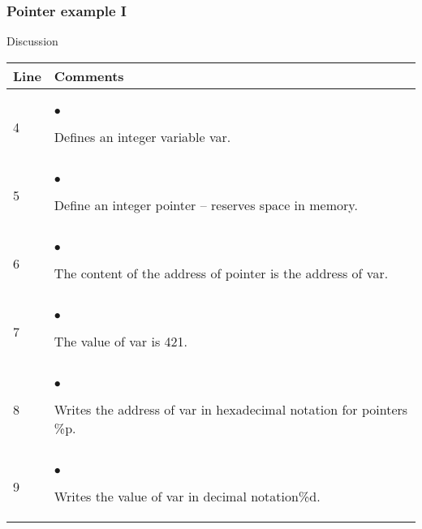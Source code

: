 \documentclass[compress]{beamer}
\begin{document}
\frame
{
  \frametitle{Pointer example I}
  \begin{block}{Discussion}
{\small
\begin{center}
%
\begin{tabular}{|ll|}\hline
\hfill Line \hfill
&\hspace*{\fill} Comments \hspace*{\fill}\\ \hline
&  \\[-2mm]
4 &$\bullet$
\begin{minipage}[t]{0.65\textwidth}
Defines an integer variable var.
\end{minipage}\\
5 &$\bullet$
\begin{minipage}[t]{0.65\textwidth}
Define an integer pointer  -- reserves space in memory.
\end{minipage}\\
6 &$\bullet$
\begin{minipage}[t]{0.65\textwidth}
The content of the address of  pointer is the  address of var.
\end{minipage}\\
7 &$\bullet$
\begin{minipage}[t]{0.65\textwidth}
The value of  var is 421.
\end{minipage}\\
8 &$\bullet$
\begin{minipage}[t]{0.65\textwidth}
Writes the address of  var in hexadecimal notation for pointers \%p.
\end{minipage}\\
9 &$\bullet$
\begin{minipage}[t]{0.65\textwidth}
Writes the value of  var in decimal notation\%d.
\end{minipage}\\[1ex]
\hline
\end{tabular}
\end{center}
} %
%
  \end{block}
}


\end{document}
